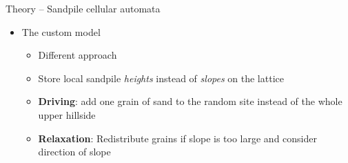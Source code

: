 \documentclass[xcolor=dvipsnames]{beamer}
\newcommand{\myitemsep}{\setlength\itemsep{0.33cm}}
\newcommand{\mysubitemsep}{\setlength\itemsep{0.22cm}}
\begin{document}
    \begin{frame}[t]{Theory -- Sandpile cellular automata}
        \begin{itemize}\myitemsep
            \item<1-> The custom model
                \begin{itemize}\mysubitemsep
                    \item<2->[$\bullet$] Different approach
                    \item<2->[$\bullet$] Store local sandpile \emph{heights} instead of \emph{slopes} on the lattice
                    \item<2->[$\bullet$] \textbf{Driving}: add one grain of sand to the random site instead of the
                                                whole upper hillside
                    \item<2->[$\bullet$] \textbf{Relaxation}: Redistribute grains if slope is too large and
                                                   consider direction of slope
                \end{itemize}
        \end{itemize}
    \end{frame}
\end{document}
